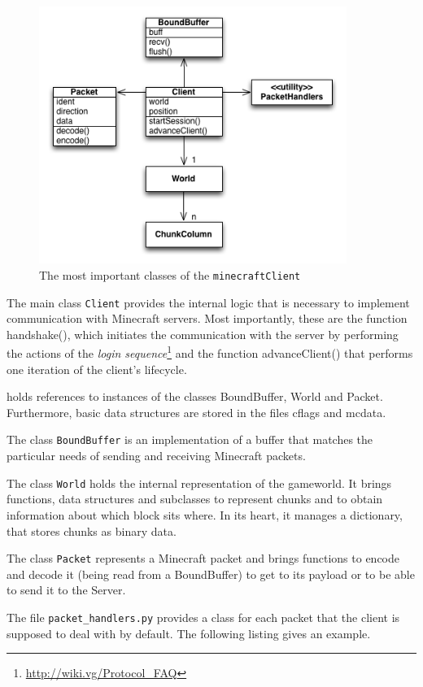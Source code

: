 
\begin{figure}[h]
  \centering
    \includegraphics[width=10cm]{graphics/spockUML_v13}
  \caption{The most important classes of the \texttt{minecraftClient}}
  \label{spock_UML}
\end{figure}

The main class \texttt{Client} provides the internal logic that is necessary to implement communication with Minecraft servers. Most importantly, these are the function handshake(), which initiates the communication with the server by performing the actions of the \emph{login sequence}\footnote{\url{http://wiki.vg/Protocol_FAQ}} and the function advanceClient() that performs one iteration of the client's lifecycle.


 holds references to instances of the classes BoundBuffer,  World and Packet. Furthermore, basic data structures are stored in the files cflags and mcdata.

The class \texttt{BoundBuffer} is an implementation of a buffer that matches the particular needs of sending and receiving Minecraft packets.

The class \texttt{World} holds the internal representation of the gameworld. It brings functions, data structures and subclasses to represent chunks and to obtain information about which block sits where. In its heart, it manages a dictionary, that stores chunks as binary data.

The class \texttt{Packet} represents a Minecraft packet and brings functions to encode and decode it (being read from a BoundBuffer) to get to its payload or to be able to send it to the Server.

The file \texttt{packet\_handlers.py} provides a class for each packet that the client is supposed to deal with by default. The following listing gives an example.


